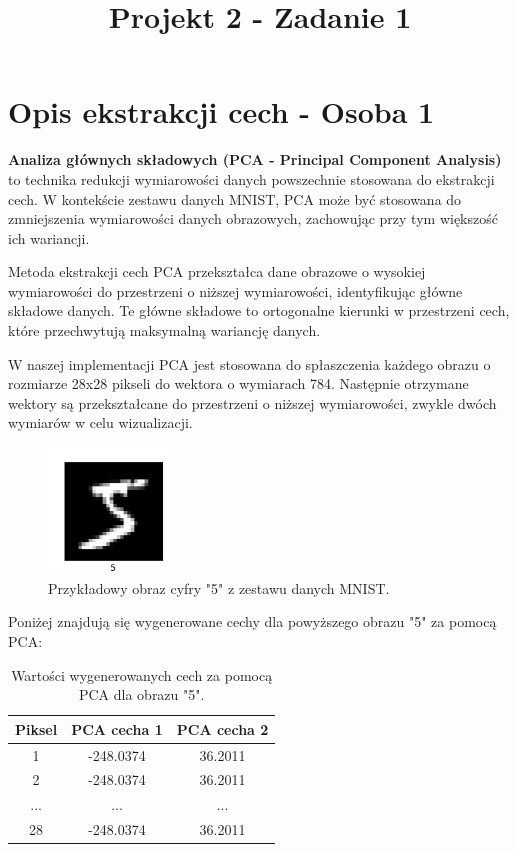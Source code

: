 \documentclass[12pt]{article}
\title{Projekt 2 - Zadanie 1}
\begin{document}
\maketitle
    \section{Opis ekstrakcji cech - Osoba 1}
    \textbf{Analiza głównych składowych (PCA - Principal Component Analysis)} to technika redukcji wymiarowości danych powszechnie stosowana do ekstrakcji cech. W kontekście zestawu danych MNIST, PCA może być stosowana do zmniejszenia wymiarowości danych obrazowych, zachowując przy tym większość ich wariancji.

    Metoda ekstrakcji cech PCA przekształca dane obrazowe o wysokiej wymiarowości do przestrzeni o niższej wymiarowości, identyfikując główne składowe danych. Te główne składowe to ortogonalne kierunki w przestrzeni cech, które przechwytują maksymalną wariancję danych.

    W naszej implementacji PCA jest stosowana do spłaszczenia każdego obrazu o rozmiarze 28x28 pikseli do wektora o wymiarach 784. Następnie otrzymane wektory są przekształcane do przestrzeni o niższej wymiarowości, zwykle dwóch wymiarów w celu wizualizacji.

    \begin{figure}[h]
        \centering
        \includegraphics[width=0.3\textwidth]{img/MNIST_1_cyfra}
        \caption{Przykładowy obraz cyfry "5" z zestawu danych MNIST.}
    \end{figure}

    Poniżej znajdują się wygenerowane cechy dla powyższego obrazu "5" za pomocą PCA:
\begin{table}[h]
\centering
\begin{tabular}{|c|c|c|}
\hline
\textbf{Piksel} & \textbf{PCA cecha 1} & \textbf{PCA cecha 2} \\
\hline
1 & -248.0374 & 36.2011 \\
2 & -248.0374 & 36.2011 \\
... & ... & ... \\
28 & -248.0374 & 36.2011 \\
\hline
\end{tabular}
\caption{Wartości wygenerowanych cech za pomocą PCA dla obrazu "5".}
\end{table}
\end{document}
